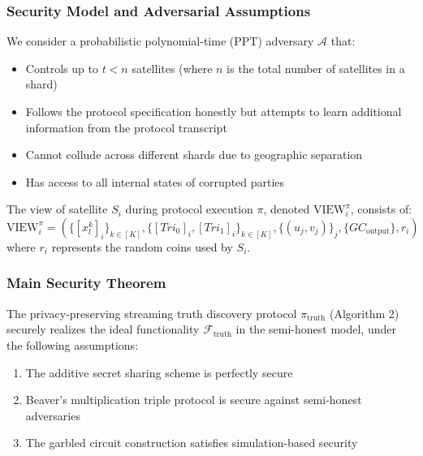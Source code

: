 \subsubsection{Security Model and Adversarial Assumptions}

\begin{definition}
\label{def:adversary_model}
We consider a probabilistic polynomial-time (PPT) adversary $\mathcal{A}$ that:
\begin{itemize}
    \item Controls up to $t < n$ satellites (where $n$ is the total number of satellites in a shard)
    \item Follows the protocol specification honestly but attempts to learn additional information from the protocol transcript
    \item Cannot collude across different shards due to geographic separation
    \item Has access to all internal states of corrupted parties
\end{itemize}
\end{definition}

\begin{definition}
\label{def:view}
The view of satellite $S_i$ during protocol execution $\pi$, denoted $\text{VIEW}_i^\pi$, consists of:
\begin{equation}
\text{VIEW}_i^\pi = \left( \{[x_l^k]_i\}_{k \in [K]}, \{[Tri_0]_i, [Tri_1]_i\}_{k \in [K]}, \{(u_j, v_j)\}_{j}, \{GC_{\text{output}}\}, r_i \right)
\end{equation}
where $r_i$ represents the random coins used by $S_i$.
\end{definition}

\subsubsection{Main Security Theorem}

\begin{theorem}
\label{thm:protocol_security}
The privacy-preserving streaming truth discovery protocol $\pi_{\text{truth}}$ (Algorithm 2) securely realizes the ideal functionality $\mathcal{F}_{\text{truth}}$ in the semi-honest model, under the following assumptions:
\begin{enumerate}
    \item The additive secret sharing scheme is perfectly secure
    \item Beaver's multiplication triple protocol is secure against semi-honest adversaries
    \item The garbled circuit construction satisfies simulation-based security
\end{enumerate}
\end{theorem}

